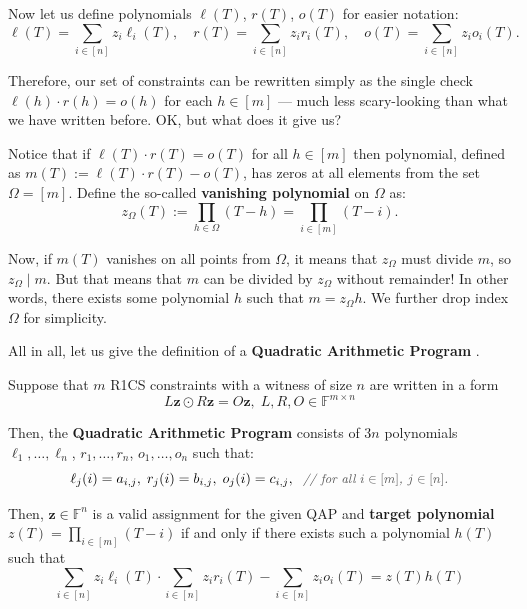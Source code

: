 \documentclass[../../book.tex]{subfiles}
\begin{document}
Now let us define polynomials $\ell(T)$, $r(T)$, $o(T)$ for easier notation: 
\begin{equation*}
    \ell(T) = \sum_{i \in [n]} z_i\ell_i(T), \quad r(T) = \sum_{i \in [n]} z_ir_i(T), \quad o(T) = \sum_{i \in [n]} z_io_i(T).
\end{equation*}

Therefore, our set of constraints can be rewritten simply as the single check
$\ell(h)\cdot r(h) = o(h)$ for each $h \in [m]$ --- much less scary-looking than
what we have written before. OK, but what does it give us? 

Notice that if $\ell(T) \cdot r(T)=o(T)$ for all $h \in [m]$ then polynomial,
defined as $m(T) := \ell(T) \cdot r(T) - o(T)$, has zeros at all elements from
the set $\Omega = [m]$. Define the so-called \textbf{vanishing polynomial} on
$\Omega$ as:
\begin{equation*}
    z_{\Omega}(T) := \prod_{h \in \Omega} (T - h) = \prod_{i \in [m]} (T - i).
\end{equation*} 

Now, if $m(T)$ vanishes on all points from $\Omega$, it means that $z_{\Omega}$
must divide $m$, so $z_{\Omega} \mid m$. But that means that $m$ can be divided
by $z_{\Omega}$ without remainder! In other words, there exists some polynomial
$h$ such that $m=z_{\Omega}h$. We further drop index $\Omega$ for simplicity. 

All in all, let us give the definition of a \textbf{Quadratic Arithmetic Program} \cite{qap}.

\begin{definition}
    Suppose that $m$ R1CS constraints with a witness of size $n$ are written in a form
    \begin{equation*}
        L\mathbf{z} \odot R\mathbf{z} = O\mathbf{z}, \; L,R,O \in \mathbb{F}^{m \times n}
    \end{equation*}

    Then, the \textbf{Quadratic Arithmetic Program} consists of $3n$ polynomials
    $\ell_1,\dots,\ell_n$, $r_1,\dots,r_n$, $o_1,\dots,o_n$ such that:
    \begin{equation*}
        \ell_j(i) = a_{i,j}, \; r_j(i) = b_{i,j}, \; o_j(i) = c_{i,j}, \; \commentgray{for all $i \in [m]$, $j \in [n]$.}
    \end{equation*}

    Then, $\mathbf{z} \in \mathbb{F}^n$ is a valid assignment for the given QAP
    and \textbf{target polynomial} $z(T) = \prod_{i \in [m]} (T-i)$ if and only
    if there exists such a polynomial $h(T)$ such that
    \begin{equation*}
        \sum_{i \in [n]} z_i\ell_i(T) \cdot \sum_{i \in [n]} z_ir_i(T) - \sum_{i \in [n]} z_io_i(T) = z(T)h(T)
    \end{equation*}
\end{definition}
\end{document}
